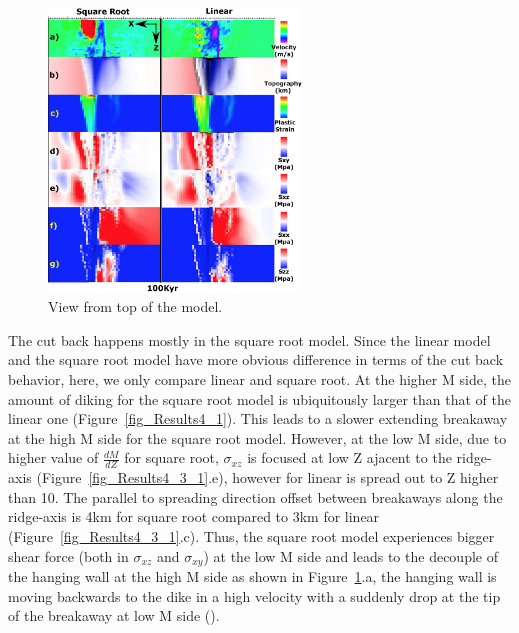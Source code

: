 \begin{figure}[hc]
  \centering
    \includegraphics[width=0.6\textwidth]{fig_Results4_3_sqrt_vs_lin_cut_back_100kyr.eps}
  \caption{View from top of the model.}
 \label{fig_Results4_3_2}
\end{figure} 

The cut back happens mostly in the square root model. Since the linear model and the square root model have more obvious difference in terms of the cut back behavior, here, we only compare linear and square root. At the higher M side, the amount of diking for the square root model is ubiquitously larger than that of the linear one (Figure~\ref{fig_Results4_1}). This leads to a slower extending breakaway at the high M side for the square root model. However, at the low M side, due to higher value of $\frac{dM}{dZ}$ for square root, $\sigma_{xz}$ is focused at low Z ajacent to the ridge-axis (Figure~\ref{fig_Results4_3_1}.e), however for linear is spread out to Z higher than 10. The parallel to spreading direction offset between breakaways along the ridge-axis is 4km for square root compared to 3km for linear (Figure~\ref{fig_Results4_3_1}.c). Thus, the square root model experiences bigger shear force (both in $\sigma_{xz}$ and $\sigma_{xy}$) at the low M side and leads to the decouple of the hanging wall at the high M side as shown in Figure~\ref{fig_Results4_3_2}.a, the hanging wall is moving backwards to the dike in a high velocity with a suddenly drop at the tip of the breakaway at low M side (). 

     

